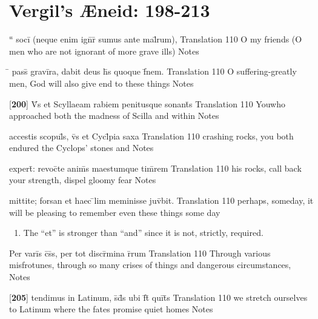 \section{Vergil's {\AE}neid:  198-213} %

\latline
  {``\={} soci\={\macron {\i}} (neque enim ign\={}r\={\macron {\i}} sumus ante mal\={}rum),}
  { Translation }
  {110}
  { O my friends (O men who are not ignorant of more grave ills) }
  { Notes }


\latline
  {\={} pass\={\macron {\i}} gravi\={}ra, dabit deus h\={\macron {\i}}s quoque f\={\macron {\i}}nem.}
  { Translation }
  {110}
  { O suffering-greatly men, God will also give end to these things }
  { Notes }


\latline
  {[\textbf{200}] V\={}s et Scyllaeam rabiem penitusque sonant\={\macron {\i}}s}
  { Translation }
  {110}
  { Youwho approached both the madness of Scilla and within }
  { Notes }


\latline
  {accestis scopul\={}s, v\={}s et Cycl\={}pia saxa }
  { Translation }
  {110}
  { crashing rocks, you both endured the Cyclops' stones and }
  { Notes }


\latline
  {expert\={\macron {\i}}:  revoc\={}te anim\={}s maestumque tim\={}rem}
  { Translation }
  {110}
  { his rocks, call back your strength, dispel gloomy fear }
  { Notes }


\latline
  {mittite; forsan et haec \={}lim meminisse juv\={}bit.}
  { Translation }
  {110}
  { perhaps, someday, it will be pleasing to remember even these things some day }
  { \begin{enumerate}
  	\item The ``et'' is stronger than ``and'' since it is not, strictly, required.  
  \end{enumerate} }


\latline
  {Per vari\={}s c\={}s\={}s, per tot discr\={\macron {\i}}mina r\={}rum}
  { Translation }
  {110}
  { Through various misfrotunes, through so many crises of things and dangerous circumstances, }
  { Notes }


\latline
  {[\textbf{205}] tendimus in Latinum, s\={}d\={}s ubi f\={}t\={} qui\={}t\={}s}
  { Translation }
  {110}
  { we stretch ourselves to Latinum where the fates promise quiet homes }
  { Notes }


